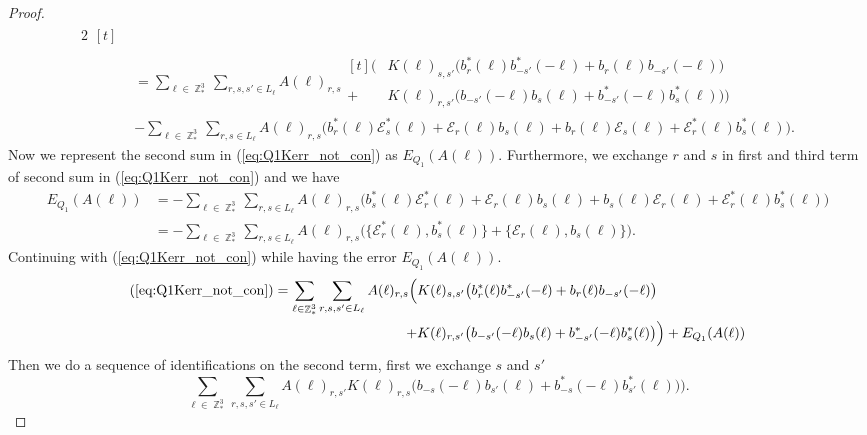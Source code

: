 \documentclass[sn-mathphys,Numbered, a4paper ,nocrop]{sn-jnl}%
\DeclareMathOperator{\Z}{\mathbb{Z}}
\theoremstyle{plain}
\theoremstyle{definition}
\theoremstyle{remark}
\theoremstyle{plain}
\theoremstyle{definition}
\theoremstyle{remark}
\begin{document}
\begin{proof}
\begin{alignat}{2}
\begin{aligned}[t]
    \end{aligned}\\
    &=\sum\limits_{\ell \in \Z^3_*}\sum\limits_{r,s,s' \in L_{\ell}}A(\ell)_{r,s}\begin{aligned}[t]
        \Big(&K(\ell)_{s,s'}\big(b^*_{r}(\ell)b^*_{-s'}(-\ell)+b_{r}(\ell)b_{-s'}(-\ell)\big)\\ + &K(\ell)_{r,s'}\big(b_{-s'}(-\ell)b_{s}(\ell)+b^*_{-s'}(-\ell)b^*_{s}(\ell) \big)\Big) 
    \end{aligned}\nonumber\\
    &-\sum\limits_{\ell \in \Z^3_*}\sum\limits_{r,s \in L_{\ell}}A(\ell)_{r,s}\Big(b^*_{r}(\ell)\mathcal{E}^*_{s}(\ell) + \mathcal{E}_{r}(\ell)b_{s}(\ell) + b_{r}(\ell)\mathcal{E}_{s}(\ell) + \mathcal{E}^*_{r}(\ell)b^*_{s}(\ell)\Big).\label{eq:Q1Kerr_not_con}
\end{alignat}
Now we represent the second sum in (\ref{eq:Q1Kerr_not_con}) as $E_{Q_1}(A(\ell))$. Furthermore, we exchange $r$ and $s$ in first and third term of second sum in (\ref{eq:Q1Kerr_not_con}) and we have
\begin{align}
    E_{Q_1}(A(\ell))&= -\sum\limits_{\ell \in \Z^3_*}\sum\limits_{r,s \in L_{\ell}}A(\ell)_{r,s}\Big(b^*_{s}(\ell)\mathcal{E}^*_{r}(\ell) + \mathcal{E}_{r}(\ell)b_{s}(\ell) + b_{s}(\ell)\mathcal{E}_{r}(\ell) + \mathcal{E}^*_{r}(\ell)b^*_{s}(\ell)\Big)\\
    &= -\sum\limits_{\ell \in \Z^3_*}\sum\limits_{r,s \in L_{\ell}}A(\ell)_{r,s}\Big(\big\{\mathcal{E}^*_{r}(\ell),b^*_{s}(\ell)\big\} + \big\{\mathcal{E}_{r}(\ell),b_{s}(\ell)\big\}\Big).
\end{align}
Continuing with (\ref{eq:Q1Kerr_not_con}) while having the error $E_{Q_1}(A(\ell))$.
\begin{align}
    (\ref{eq:Q1Kerr_not_con}) = \sum\limits_{\ell \in \Z^3_*}\sum\limits_{r,s,s' \in L_{\ell}}A(\ell)_{r,s}
        \Big(&K(\ell)_{s,s'}\big(b^*_{r}(\ell)b^*_{-s'}(-\ell)+b_{r}(\ell)b_{-s'}(-\ell)\big)\nonumber\\ + &K(\ell)_{r,s'}\big(b_{-s'}(-\ell)b_{s}(\ell)+b^*_{-s'}(-\ell)b^*_{s}(\ell) \big)\Big) + E_{Q_1}(A(\ell))\label{eq:Q1Knoiden}
\end{align}
Then we do a sequence of identifications on the second term, first we exchange $s$ and $s'$ 
\begin{equation}
    \sum\limits_{\ell \in \Z^3_*}\sum\limits_{r,s,s' \in L_{\ell}}A(\ell)_{r,s'}K(\ell)_{r,s}\big(b_{-s}(-\ell)b_{s'}(\ell)+b^*_{-s}(-\ell)b^*_{s'}(\ell) \big)\Big).
\end{equation}

\end{proof}
\end{document}
